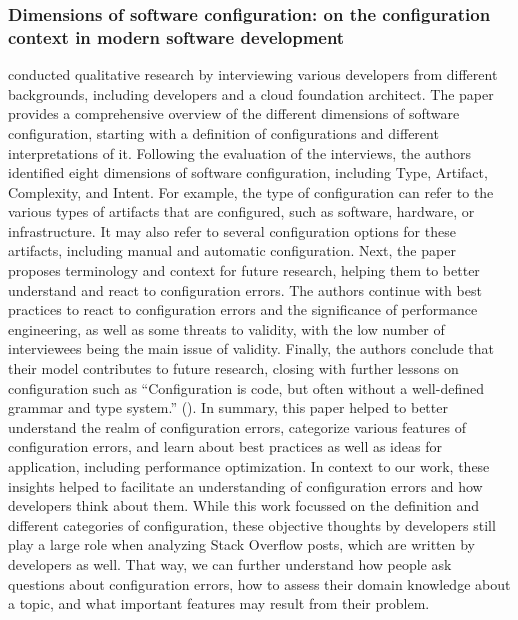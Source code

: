 \documentclass[english,bachelor]{swsLeipzig}
\begin{document}
\subsubsection{Dimensions of software configuration: on the configuration context in modern software development}
\citet{siegmund:2020} conducted qualitative research by interviewing various developers from different backgrounds, 
including developers and a cloud foundation architect. The paper provides a comprehensive overview of the different dimensions of software configuration, starting with a definition of configurations and different interpretations of it. Following the evaluation of the interviews, the authors identified eight dimensions of software configuration, including Type, Artifact, Complexity, and Intent. For example, the type of configuration can refer to the various types of artifacts that are configured, such as software, hardware, or infrastructure. It may also refer to several configuration options for these artifacts, including manual and automatic configuration. Next, the paper proposes terminology and context for future research, helping them to better understand and react to configuration errors. The authors continue with best practices to react to configuration errors and the significance of performance engineering, as well as some threats to validity, with the low number of interviewees being the main issue of validity. Finally, the authors conclude that their model contributes to future research, closing with further lessons on configuration such as ``Configuration is code, but often without a well-defined grammar and type system.'' (\citet{siegmund:2020}). In summary, this paper helped to better understand the realm of configuration errors, categorize various features of configuration errors, and learn about best practices as well as ideas for application, including performance optimization. In context to our work, these insights helped to facilitate an understanding of configuration errors and how developers think about them. While this work focussed on the definition and different categories of configuration, these objective thoughts by developers still play a large role when analyzing Stack Overflow posts, which are written by developers as well. That way, we can further understand how people ask questions about configuration errors, how to assess their domain knowledge about a topic, and what important features may result from their problem.
\end{document}

